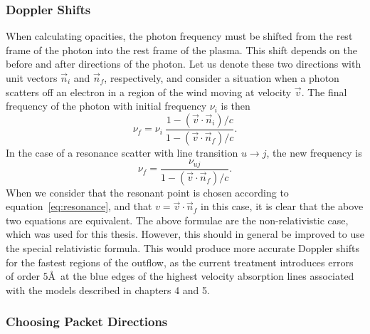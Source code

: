 \subsubsection{Doppler Shifts}

When calculating opacities, the photon frequency must be shifted from
the rest frame of the photon into the rest frame of the plasma.
This shift depends on the before and after directions of the photon. Let us denote
these two directions with unit vectors $\vec{n}_i$ and $\vec{n}_f$, respectively,
and consider a situation when a photon scatters off an electron in a region of the
wind moving at velocity $\vec{v}$.
The final frequency of the photon with initial frequency $\nu_i$ is then 
\begin{equation}
\nu_f = \nu_i ~\frac{1 - (\vec{v} \cdot \vec{n}_i) / c}{1 - (\vec{v} \cdot \vec{n}_f) / c}.
\end{equation}
In the case of a resonance scatter with line transition $u \rightarrow j$, the 
new frequency is
\begin{equation}
\nu_f = \frac{\nu_{uj}}{1 - (\vec{v} \cdot \vec{n}_f) / c}.
\end{equation}
When we consider that the resonant point is chosen according to 
equation~\ref{eq:resonance}, and that $v=\vec{v} \cdot \vec{n}_f$ in this case,
it is clear that the above two equations are equivalent. The above formulae are the 
non-relativistic case, which was used for this thesis. However, this should in general 
be improved to use the special relativistic formula.
This would produce more accurate Doppler shifts for the fastest regions of the 
outflow, as the current treatment 
introduces errors of order $5$\AA\ at the blue edges of the highest velocity
absorption lines associated with the models described in chapters 4 and 5.



\subsubsection{Choosing Packet Directions}


